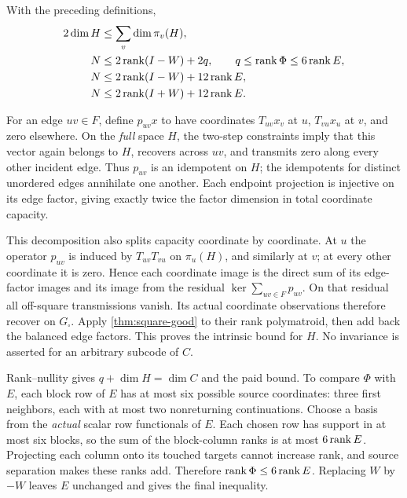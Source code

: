 \begin{theorem}\label{thm:stability}
With the preceding definitions,
\begin{align*}
 2\dim H&\leq\sum_v\dim\pi_v(H),\\
 N&\leq2\operatorname{rank}(I-W)+2q,\qquad q\leq\operatorname{rank}\Phi\leq6\operatorname{rank} E,\\
 N&\leq2\operatorname{rank}(I-W)+12\operatorname{rank} E,\\
 N&\leq2\operatorname{rank}(I+W)+12\operatorname{rank} E.
\end{align*}
\end{theorem}
\begin{outline}
For an edge $uv\in F$, define $p_{uv}x$ to have coordinates
$T_{uv}x_v$ at $u$, $T_{vu}x_u$ at $v$, and zero elsewhere.
On the \emph{full} space $H$, the two-step constraints imply that this
vector again belongs to $H$, recovers across $uv$, and transmits zero
along every other incident edge. Thus $p_{uv}$ is an idempotent on $H$;
the idempotents for distinct unordered edges annihilate one another.
Each endpoint projection is injective on its edge factor, giving
exactly twice the factor dimension in total coordinate capacity.

This decomposition also splits capacity coordinate by coordinate. At
$u$ the operator $p_{uv}$ is induced by $T_{uv}T_{vu}$ on $\pi_u(H)$,
and similarly at $v$; at every other coordinate it is zero. Hence each
coordinate image is the direct sum of its edge-factor images and its
image from the residual $\ker\sum_{uv\in F}p_{uv}$. On that residual
all off-square transmissions vanish. Its actual coordinate observations
therefore recover on $G_\square$. Apply \cref{thm:square-good} to their
rank polymatroid, then add back the balanced edge factors. This proves
the intrinsic bound for $H$. No invariance is asserted for an arbitrary
subcode of $C$.

Rank--nullity gives $q+\dim H=\dim C$ and the paid bound. To compare
$\Phi$ with $E$, each block row of $E$ has at most six possible source
coordinates: three first neighbors, each with at most two nonreturning
continuations. Choose a basis from the \emph{actual} scalar row
functionals of $E$. Each chosen row has support in at most six blocks,
so the sum of the block-column ranks is at most $6\operatorname{rank} E$.
Projecting each column onto its touched targets cannot increase rank,
and source separation makes these ranks add. Therefore
$\operatorname{rank}\Phi\leq6\operatorname{rank} E$. Replacing $W$ by $-W$ leaves $E$ unchanged
and gives the final inequality.
\end{outline}

